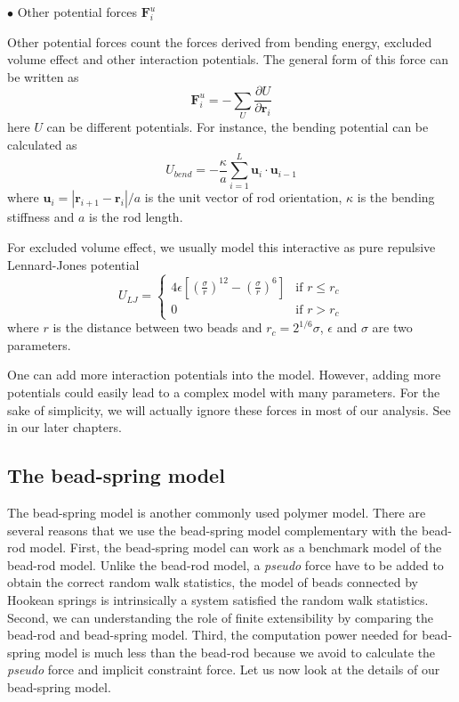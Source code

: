 $\bullet$ Other potential forces $\mathbf{F}_i^{u}$

Other potential forces count the forces derived from bending energy, excluded volume effect and other interaction potentials. The general form of this force can be written as
\begin{equation}
    \label{eq:potentialForce}
    \mathbf{F}_i^{u} = -\sum_{U}\frac{\partial U}{\partial\mathbf{r}_i}
\end{equation}
here $U$ can be different potentials. For instance, the bending potential can be calculated as 
\begin{equation}
    \label{eq:bending}
    U_{bend} = - \frac{\kappa}{a} \sum_{i=1}^{L} \mathbf{u}_i \cdot \mathbf{u}_{i-1}
\end{equation}
where $\mathbf{u}_i = |\mathbf{r}_{i+1} - \mathbf{r}_{i}|/a$ is the unit vector of rod orientation, $\kappa$ is the bending stiffness and $a$ is the rod length.

For excluded volume effect, we usually model this interactive as pure repulsive Lennard-Jones potential
\begin{equation}
    \label{eq:lennardJones}
    U_{LJ} =  
    \begin{cases} 
        4\epsilon\left[\left(\frac{\sigma}{r}\right)^{12} -  \left(\frac{\sigma}{r}\right)^6\right] 
        & \text{if } r \leq r_c \\
        0       & \text{if } r > r_c 
  \end{cases}
\end{equation}
where $r$ is the distance between two beads and $r_c = 2^{1/6}\sigma$, $\epsilon$ and $\sigma$ are two parameters.

One can add more interaction potentials into the model. However, adding more potentials could easily lead to a complex model with many parameters. For the sake of simplicity, we will actually ignore these forces in most of our analysis. See in our later chapters.


\subsection{The bead-spring model}
\label{sub:the_bead_spring_model}

The bead-spring model is another commonly used polymer model. There are several reasons that we use the bead-spring model complementary with the bead-rod model. First, the bead-spring model can work as a benchmark model of the bead-rod model. Unlike the bead-rod model, a \emph{pseudo} force have to be added to obtain the correct random walk statistics, the model of beads connected by Hookean springs is intrinsically a system satisfied the random walk statistics. Second, we can understanding the role of finite extensibility by comparing the bead-rod and bead-spring model. Third, the computation power needed for bead-spring model is much less than the bead-rod because we avoid to calculate the \emph{pseudo} force and implicit constraint force. Let us now look at the details of our bead-spring model.

